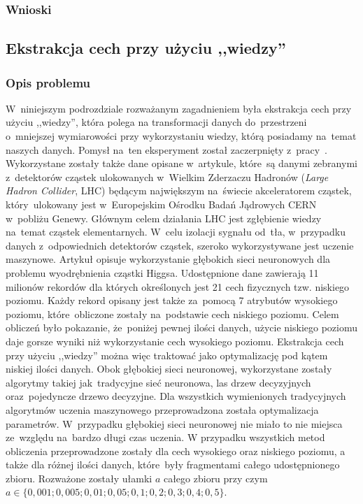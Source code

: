 \subsubsection{Wnioski}

\subsection{Ekstrakcja cech przy użyciu ,,wiedzy''}
\subsubsection{Opis problemu}
W~niniejszym podrozdziale rozważanym zagadnieniem była ekstrakcja cech przy użyciu ,,wiedzy'', która polega na transformacji danych do~przestrzeni o~mniejszej wymiarowości przy wykorzystaniu wiedzy, którą posiadamy na~temat naszych danych. Pomysł na~ten eksperyment został zaczerpnięty z~pracy~\cite{higgs1}. Wykorzystane zostały także dane opisane w~artykule, które~są danymi zebranymi z~detektorów cząstek ulokowanych w~Wielkim Zderzaczu Hadronów (\textit{Large Hadron Collider}, LHC) będącym największym na~świecie akceleratorem cząstek, który~ulokowany jest w~Europejskim Ośrodku Badań Jądrowych CERN w~pobliżu Genewy. Głównym celem działania LHC jest zgłębienie wiedzy na~temat cząstek elementarnych. W~celu izolacji sygnału od~tła, w~przypadku danych z~odpowiednich detektorów cząstek, szeroko wykorzystywane jest uczenie maszynowe. Artykuł opisuje wykorzystanie głębokich sieci neuronowych dla problemu wyodrębnienia cząstki Higgsa. Udostępnione dane zawierają 11 milionów rekordów dla których określonych jest 21 cech fizycznych tzw. niskiego poziomu. Każdy rekord opisany jest także za~pomocą 7 atrybutów wysokiego poziomu, które~obliczone zostały na~podstawie cech niskiego poziomu. Celem obliczeń było pokazanie, że~poniżej pewnej ilości danych, użycie niskiego poziomu daje gorsze wyniki niż wykorzystanie cech wysokiego poziomu. Ekstrakcja cech przy użyciu ,,wiedzy'' można więc traktować jako optymalizację pod kątem niskiej ilości danych. Obok głębokiej sieci neuronowej, wykorzystane zostały algorytmy takiej jak~tradycyjne sieć neuronowa, las drzew decyzyjnych oraz~pojedyncze drzewo decyzyjne. Dla wszystkich wymienionych tradycyjnych algorytmów uczenia maszynowego przeprowadzona została optymalizacja parametrów. W~przypadku głębokiej sieci neuronowej nie miało to nie miejsca ze~względu na~bardzo długi czas uczenia. W przypadku wszystkich metod obliczenia przeprowadzone zostały dla cech wysokiego oraz niskiego poziomu, a także dla różnej ilości danych, które~były fragmentami całego udostępnionego zbioru. Rozważone zostały ułamki $a$ całego zbioru przy czym $a\in\{0,001; 0,005; 0,01; 0,05; 0,1; 0,2; 0,3; 0,4; 0,5\}$. 

